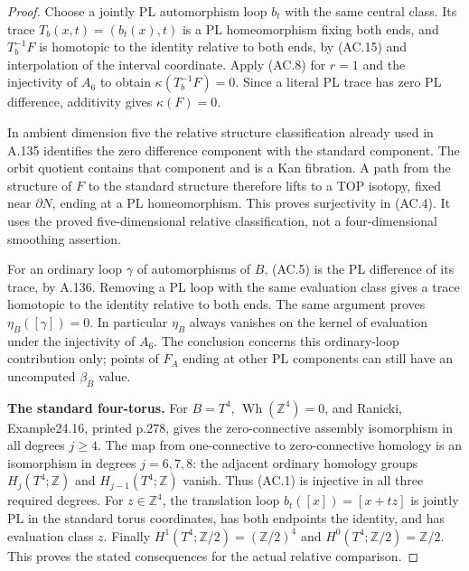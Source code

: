 \begin{proof}
Choose a jointly PL automorphism loop $b_t$ with the same central
class. Its trace $T_b(x,t)=(b_t(x),t)$ is a PL homeomorphism fixing
both ends, and $T_b^{-1}F$ is homotopic to the identity relative to
both ends, by (AC.15) and interpolation of the interval coordinate.
Apply (AC.8) for $r=1$ and the injectivity of $A_6$ to obtain
$\kappa(T_b^{-1}F)=0$. Since a literal PL trace has zero PL
difference, additivity gives $\kappa(F)=0$.

In ambient dimension five the relative structure classification
already used in A.135 identifies the zero difference component
with the standard component. The orbit quotient contains that
component and is a Kan fibration. A path from the structure of $F$
to the standard structure therefore lifts to a TOP isotopy, fixed
near $\partial N$, ending at a PL homeomorphism. This proves
surjectivity in (AC.4). It uses the proved five-dimensional relative
classification, not a four-dimensional smoothing assertion.

For an ordinary loop $\gamma$ of automorphisms of $B$, (AC.5) is
the PL difference of its trace, by A.136. Removing a PL loop with
the same evaluation class gives a trace homotopic to the identity
relative to both ends. The same argument proves $\eta_B([\gamma])=0$.
In particular $\eta_B$ always vanishes on the kernel of evaluation
under the injectivity of $A_6$. The conclusion concerns this
ordinary-loop contribution only; points of $F_A$ ending at other
PL components can still have an uncomputed $\beta_B$ value.

\textbf{The standard four-torus.}
For $B=T^4$, $\operatorname{Wh}(\mathbb Z^4)=0$, and Ranicki,
Example24.16, printed p.278, gives the zero-connective assembly
isomorphism in all degrees $j\ge4$. The map from one-connective to
zero-connective homology is an isomorphism in degrees $j=6,7,8$:
the adjacent ordinary homology groups $H_j(T^4;\mathbb Z)$ and
$H_{j-1}(T^4;\mathbb Z)$ vanish. Thus (AC.1) is injective in all
three required degrees. For $z\in\mathbb Z^4$, the translation loop
$b_t([x])=[x+tz]$ is jointly PL in the standard torus coordinates,
has both endpoints the identity, and has evaluation class $z$.
Finally $H^1(T^4;\mathbb Z/2)=(\mathbb Z/2)^4$ and
$H^0(T^4;\mathbb Z/2)=\mathbb Z/2$. This proves the stated
consequences for the actual relative comparison.


\end{proof}
